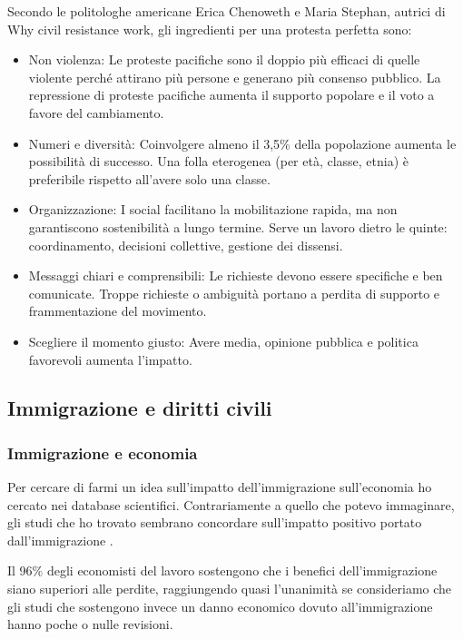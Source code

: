 \documentclass[12pt]{book} %
\begin{document}
\begin{mdframed}[linewidth=1pt]
Secondo le politologhe americane Erica Chenoweth e Maria Stephan, autrici di Why civil resistance work, gli ingredienti per una protesta perfetta sono:
\begin{itemize}
\item Non violenza: Le proteste pacifiche sono il doppio più efficaci di quelle violente perché attirano più persone e generano più consenso pubblico. La repressione di proteste pacifiche aumenta il supporto popolare e il voto a favore del cambiamento.
\item Numeri e diversità: Coinvolgere almeno il 3,5\% della popolazione aumenta le possibilità di successo. Una folla eterogenea (per età, classe, etnia) è preferibile rispetto all'avere solo una classe.
\item Organizzazione: I social facilitano la mobilitazione rapida, ma non garantiscono sostenibilità a lungo termine. Serve un lavoro dietro le quinte: coordinamento, decisioni collettive, gestione dei dissensi.
\item Messaggi chiari e comprensibili: Le richieste devono essere specifiche e ben comunicate. Troppe richieste o ambiguità portano a perdita di supporto e frammentazione del movimento.
\item Scegliere il momento giusto: Avere media, opinione pubblica e politica favorevoli aumenta l’impatto.
\end{itemize}
\end{mdframed}

\subsection{Immigrazione e diritti civili}

\subsubsection{Immigrazione e economia}
Per cercare di farmi un idea sull'impatto dell'immigrazione sull'economia ho cercato nei database scientifici. Contrariamente a quello che potevo immaginare, gli studi che ho trovato sembrano concordare sull'impatto positivo portato dall'immigrazione  .

Il 96\% degli economisti del lavoro sostengono che i benefici dell'immigrazione siano
superiori alle perdite, raggiungendo quasi
l'unanimità se consideriamo che gli studi che sostengono invece un danno economico dovuto
all'immigrazione hanno poche o nulle revisioni.
\end{document}
